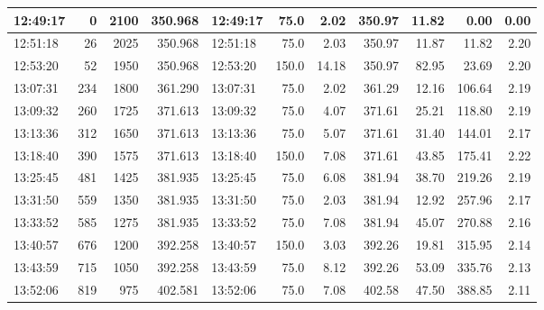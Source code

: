 \begin{table}[ht!]
\begin{adjustbox}{max width=\textwidth}
\begin{tabular}{|l|r|r|r|l|r|r|r|r|r|r|}
12:49:17 &                  0 &               2100 &         350.968 & 12:49:17 &             75.0 &       2.02 &         350.97 &  11.82 &       0.00 & 0.00 \\ \hline
12:51:18 &                 26 &               2025 &         350.968 & 12:51:18 &             75.0 &       2.03 &         350.97 &  11.87 &      11.82 & 2.20 \\ \hline
12:53:20 &                 52 &               1950 &         350.968 & 12:53:20 &            150.0 &      14.18 &         350.97 &  82.95 &      23.69 & 2.20 \\ \hline
13:07:31 &                234 &               1800 &         361.290 & 13:07:31 &             75.0 &       2.02 &         361.29 &  12.16 &     106.64 & 2.19 \\ \hline
13:09:32 &                260 &               1725 &         371.613 & 13:09:32 &             75.0 &       4.07 &         371.61 &  25.21 &     118.80 & 2.19 \\ \hline
13:13:36 &                312 &               1650 &         371.613 & 13:13:36 &             75.0 &       5.07 &         371.61 &  31.40 &     144.01 & 2.17 \\ \hline
13:18:40 &                390 &               1575 &         371.613 & 13:18:40 &            150.0 &       7.08 &         371.61 &  43.85 &     175.41 & 2.22 \\ \hline
13:25:45 &                481 &               1425 &         381.935 & 13:25:45 &             75.0 &       6.08 &         381.94 &  38.70 &     219.26 & 2.19 \\ \hline
13:31:50 &                559 &               1350 &         381.935 & 13:31:50 &             75.0 &       2.03 &         381.94 &  12.92 &     257.96 & 2.17 \\ \hline
13:33:52 &                585 &               1275 &         381.935 & 13:33:52 &             75.0 &       7.08 &         381.94 &  45.07 &     270.88 & 2.16 \\ \hline
13:40:57 &                676 &               1200 &         392.258 & 13:40:57 &            150.0 &       3.03 &         392.26 &  19.81 &     315.95 & 2.14 \\ \hline
13:43:59 &                715 &               1050 &         392.258 & 13:43:59 &             75.0 &       8.12 &         392.26 &  53.09 &     335.76 & 2.13 \\ \hline
13:52:06 &                819 &                975 &         402.581 & 13:52:06 &             75.0 &       7.08 &         402.58 &  47.50 &     388.85 & 2.11 \\ \hline

\end{tabular}
\end{adjustbox}
\end{table}
